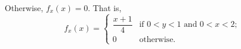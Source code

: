 \documentclass{article}
\begin{document}
Otherwise, $f_x(x)=0$. That is,
\[
f_x(x) = \begin{cases}
\dfrac{x+1}{4} & \text{if } 0<y<1 \text{ and } 0<x<2; \\
0 & \text{otherwise}.
\end{cases}
\]
\end{document}
